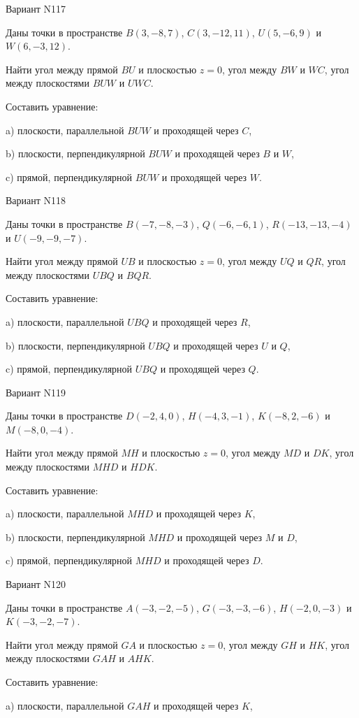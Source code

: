 \documentclass[11pt]{report}
\begin{document}
Вариант N117

Даны точки в пространстве
$B(3, -8, 7)$, $C(3, -12, 11)$, $U(5, -6, 9)$ и
$W(6, -3, 12)$.

Найти угол между прямой $BU$ и плоскостью $z = 0$, угол между $BW$ и $WC$, угол между плоскостями $BUW$ 
и $UWC$.

Составить уравнение: 

a) плоскости, параллельной $BUW$ и проходящей через $C$,

b) плоскости, перпендикулярной $BUW$ и проходящей через $B$ и $W$,

c) прямой, перпендикулярной $BUW$ и проходящей через $W$.

Вариант N118

Даны точки в пространстве
$B(-7, -8, -3)$, $Q(-6, -6, 1)$, $R(-13, -13, -4)$ и
$U(-9, -9, -7)$.

Найти угол между прямой $UB$ и плоскостью $z = 0$, угол между $UQ$ и $QR$, угол между плоскостями $UBQ$ 
и $BQR$.

Составить уравнение: 

a) плоскости, параллельной $UBQ$ и проходящей через $R$,

b) плоскости, перпендикулярной $UBQ$ и проходящей через $U$ и $Q$,

c) прямой, перпендикулярной $UBQ$ и проходящей через $Q$.

Вариант N119

Даны точки в пространстве
$D(-2, 4, 0)$, $H(-4, 3, -1)$, $K(-8, 2, -6)$ и
$M(-8, 0, -4)$.

Найти угол между прямой $MH$ и плоскостью $z = 0$, угол между $MD$ и $DK$, угол между плоскостями $MHD$ 
и $HDK$.

Составить уравнение: 

a) плоскости, параллельной $MHD$ и проходящей через $K$,

b) плоскости, перпендикулярной $MHD$ и проходящей через $M$ и $D$,

c) прямой, перпендикулярной $MHD$ и проходящей через $D$.

Вариант N120

Даны точки в пространстве
$A(-3, -2, -5)$, $G(-3, -3, -6)$, $H(-2, 0, -3)$ и
$K(-3, -2, -7)$.

Найти угол между прямой $GA$ и плоскостью $z = 0$, угол между $GH$ и $HK$, угол между плоскостями $GAH$ 
и $AHK$.

Составить уравнение: 

a) плоскости, параллельной $GAH$ и проходящей через $K$,
\end{document}
